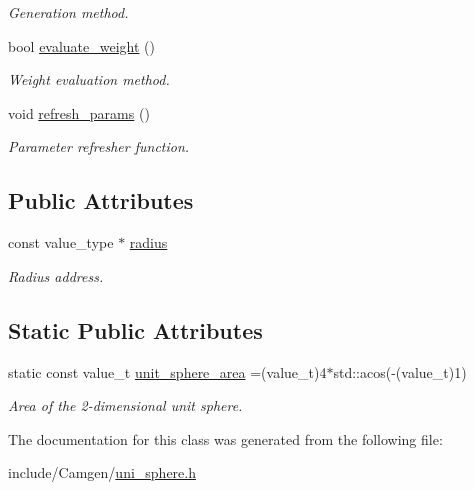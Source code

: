 \begin{DoxyCompactItemize}
\begin{DoxyCompactList}\small\item\em Generation method. \end{DoxyCompactList}\item 
\hypertarget{a00568_a33d815c967c20539794149c98ff6d5b3}{}bool \hyperlink{a00568_a33d815c967c20539794149c98ff6d5b3}{evaluate\+\_\+weight} ()\label{a00568_a33d815c967c20539794149c98ff6d5b3}

\begin{DoxyCompactList}\small\item\em Weight evaluation method. \end{DoxyCompactList}\item 
\hypertarget{a00568_a619daae5a8feed52d5faaedfcb585d8e}{}void \hyperlink{a00568_a619daae5a8feed52d5faaedfcb585d8e}{refresh\+\_\+params} ()\label{a00568_a619daae5a8feed52d5faaedfcb585d8e}

\begin{DoxyCompactList}\small\item\em Parameter refresher function. \end{DoxyCompactList}\end{DoxyCompactItemize}
\subsection*{Public Attributes}
\begin{DoxyCompactItemize}
\item 
\hypertarget{a00568_ae47846d4662f49649cdfe7dd38ca876e}{}const value\+\_\+type $\ast$ \hyperlink{a00568_ae47846d4662f49649cdfe7dd38ca876e}{radius}\label{a00568_ae47846d4662f49649cdfe7dd38ca876e}

\begin{DoxyCompactList}\small\item\em Radius address. \end{DoxyCompactList}\end{DoxyCompactItemize}
\subsection*{Static Public Attributes}
\begin{DoxyCompactItemize}
\item 
\hypertarget{a00568_a21886a7c7da83aef5c4b34fc552d9168}{}static const value\+\_\+t \hyperlink{a00568_a21886a7c7da83aef5c4b34fc552d9168}{unit\+\_\+sphere\+\_\+area} =(value\+\_\+t)4$\ast$std\+::acos(-\/(value\+\_\+t)1)\label{a00568_a21886a7c7da83aef5c4b34fc552d9168}

\begin{DoxyCompactList}\small\item\em Area of the 2-\/dimensional unit sphere. \end{DoxyCompactList}\end{DoxyCompactItemize}


The documentation for this class was generated from the following file\+:\begin{DoxyCompactItemize}
\item 
include/\+Camgen/\hyperlink{a00822}{uni\+\_\+sphere.\+h}\end{DoxyCompactItemize}
